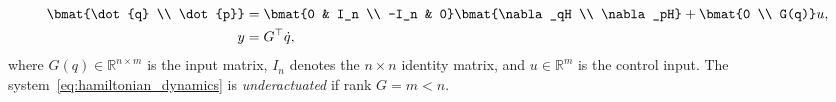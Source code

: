 %
\begin{align}
    \begin{split}  
      \bmat{\dot{q} \\ \dot{p}} &= \bmat{0 & I_n \\ -I_n & 0}\bmat{\nabla_qH \\
      \nabla_pH} + \bmat{0 \\ G(q)}u, \\
      y &= G^\top \dot{q},
    \end{split}
    \label{eq:hamiltonian_dynamics}
\end{align}
%
where $G(q) \in \mathbb{R}^{n \times m}$ is the input matrix, $I_n$ denotes the
$n \times n$ identity matrix, and $u \in \mathbb{R}^m$ is
the control input.
%
The system~\eqref{eq:hamiltonian_dynamics} is \textit{underactuated} if rank $G
= m < n$.

